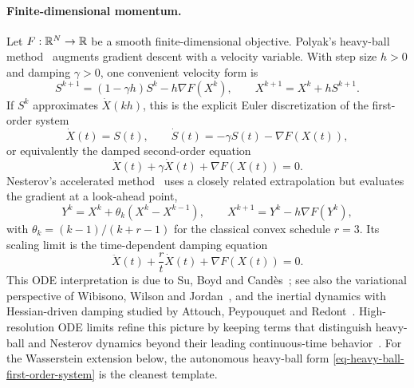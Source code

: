 \paragraph{Finite-dimensional momentum.}
Let $F:\mathbb{R}^{N}\to\mathbb{R}$ be a smooth finite-dimensional objective. Polyak's heavy-ball method~\cite{Polyak1964HeavyBall} augments gradient descent with a velocity variable. With step size $h>0$ and damping $\gamma>0$, one convenient velocity form is
\begin{equation}\label{eq-polyak-momentum}
	S^{k+1}=(1-\gamma h)S^k-h\nabla F(X^k),
	\qquad
	X^{k+1}=X^k+hS^{k+1}.
\end{equation}
If $S^k$ approximates $\dot X(kh)$, this is the explicit Euler discretization of the first-order system
\begin{equation}\label{eq-heavy-ball-first-order-system}
	\dot X(t)=S(t),
	\qquad
	\dot S(t)=-\gamma S(t)-\nabla F(X(t)),
\end{equation}
or equivalently the damped second-order equation
\begin{equation}\label{eq-heavy-ball-ode}
	\ddot X(t)+\gamma\dot X(t)+\nabla F(X(t))=0.
\end{equation}
Nesterov's accelerated method~\cite{Nesterov1983Accelerated} uses a closely related extrapolation but evaluates the gradient at a look-ahead point,
\begin{equation}\label{eq-nesterov-momentum}
	Y^k=X^k+\theta_k(X^k-X^{k-1}),
	\qquad
	X^{k+1}=Y^k-h\nabla F(Y^k),
\end{equation}
with $\theta_k=(k-1)/(k+r-1)$ for the classical convex schedule $r=3$. Its scaling limit is the time-dependent damping equation
\begin{equation}\label{eq-nesterov-ode}
	\ddot X(t)+\frac{r}{t}\dot X(t)+\nabla F(X(t))=0.
\end{equation}
This ODE interpretation is due to Su, Boyd and Cand{\`e}s~\cite{SuBoydCandes2016ODE}; see also the variational perspective of Wibisono, Wilson and Jordan~\cite{WibisonoWilsonJordan2016Acceleration}, and the inertial dynamics with Hessian-driven damping studied by Attouch, Peypouquet and Redont~\cite{AttouchPeypouquetRedont2016HessianDamping}. High-resolution ODE limits refine this picture by keeping terms that distinguish heavy-ball and Nesterov dynamics beyond their leading continuous-time behavior~\cite{ShiDuJordanSu2018HighResolution}. For the Wasserstein extension below, the autonomous heavy-ball form \eqref{eq-heavy-ball-first-order-system} is the cleanest template.

